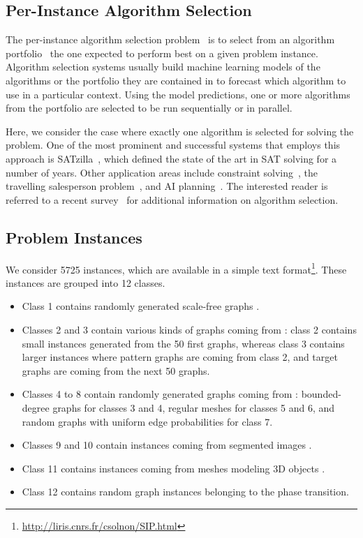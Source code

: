 \documentclass{llncs}
\begin{document}
\subsection{Per-Instance Algorithm Selection}

The per-instance algorithm selection problem~\cite{rice_algorithm_1976} is to select from an
algorithm portfolio~\cite{huberman_economics_1997,gomes_algorithm_2001} the one expected to perform
best on a given problem instance. Algorithm selection systems usually build machine learning models
of the algorithms or the portfolio they are contained in to forecast which algorithm to use in a
particular context. Using the model predictions, one or more algorithms from the portfolio are
selected to be run sequentially or in parallel.

Here, we consider the case where exactly one algorithm is selected for solving the problem. One of
the most prominent and successful systems that employs this approach is
SATzilla~\cite{xu_satzilla_2008}, which defined the state of the art in SAT solving for a number of
years. Other application areas include constraint solving~\cite{omahony_using_2008}, the travelling
salesperson problem~\cite{kotthoff_improving_2015}, and AI planning~\cite{seipp_learning_2012}.
The interested reader is referred to a recent survey~\cite{kotthoff_algorithm_2014} for additional
information on algorithm selection.

\subsection{Problem Instances}

We consider 5725 instances, which are available in a simple text
format\footnote{\url{http://liris.cnrs.fr/csolnon/SIP.html}}. These
instances are grouped into 12 classes.

\begin{itemize}
\item Class 1 contains randomly generated scale-free graphs \cite{constraints10}.
\item Classes 2 and 3 contain various kinds of graphs coming from \cite{LV02}: class 2 contains small
    instances generated from the 50 first graphs, whereas class 3 contains larger
    instances where pattern graphs are coming from class 2, and target graphs are coming from the
    next 50 graphs.
\item Classes 4 to 8 contain randomly generated graphs coming from
    \cite{GraphDatabase1,GraphDatabase2}: bounded-degree graphs for classes 3 and 4, regular meshes
    for classes 5 and 6, and random graphs with uniform edge probabilities for class 7.
\item Classes 9 and 10 contain instances coming from segmented images \cite{pr15,cviu11}.
\item Class 11 contains instances coming from meshes modeling 3D objects \cite{cviu11}.
\item Class 12 contains random graph instances belonging to the phase transition.
\end{itemize}
\end{document}
